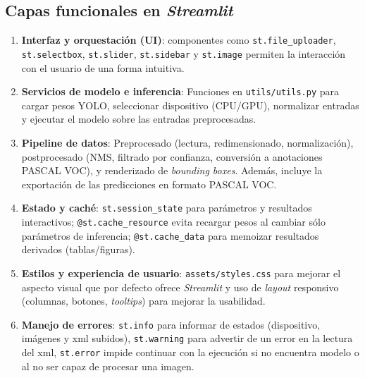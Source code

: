 \documentclass[12pt,a4paper,onecolumn,oneside]{report}
\begin{document}
\subsection{Capas funcionales en \textit{Streamlit}}
\begin{enumerate}
  \item \textbf{Interfaz y orquestación (UI)}: componentes como \texttt{st.file\_uploader}, \texttt{st.selectbox}, \texttt{st.slider}, \texttt{st.sidebar} y \texttt{st.image} permiten la interacción con el usuario de una forma intuitiva.
  \item \textbf{Servicios de modelo e inferencia}: Funciones en \texttt{utils/utils.py} para cargar pesos YOLO, seleccionar dispositivo (CPU/GPU), normalizar entradas y ejecutar el modelo sobre las entradas preprocesadas.
  \item \textbf{Pipeline de datos}: Preprocesado (lectura, redimensionado, normalización), postprocesado (NMS, filtrado por confianza, conversión a anotaciones PASCAL VOC), y renderizado de \textit{bounding boxes}. 
  Además, incluye la exportación de las predicciones en formato PASCAL VOC. 
  \item \textbf{Estado y caché}: \texttt{st.session\_state} para parámetros y resultados interactivos; \texttt{@st.cache\_resource} evita recargar 
  pesos al cambiar sólo parámetros de inferencia; \texttt{@st.cache\_data} para memoizar resultados derivados (tablas/figuras).
  \item \textbf{Estilos y experiencia de usuario}: \texttt{assets/styles.css} para mejorar el aspecto visual que por defecto ofrece \textit{Streamlit} y uso de \textit{layout} 
  responsivo (columnas, botones, \textit{tooltips}) para mejorar la usabilidad.
  \item \textbf{Manejo de errores}: \texttt{st.info} para informar de estados (dispositivo, imágenes y xml subidos), \texttt{st.warning} para advertir de un error en la lectura del xml, 
  \texttt{st.error} impide continuar con la ejecución si no encuentra modelo o al no ser capaz de procesar una imagen.
\end{enumerate}
\end{document}
